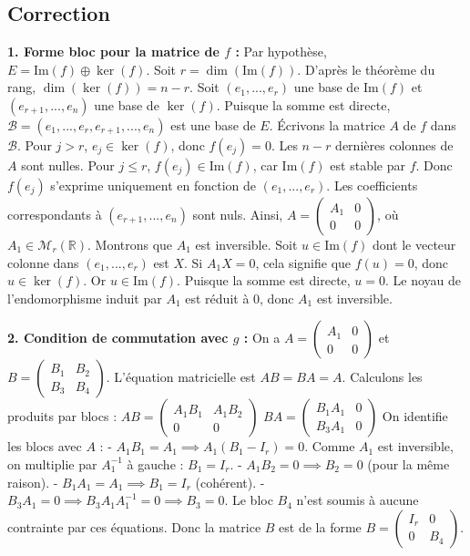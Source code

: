 \documentclass{report}
\begin{document}
\subsection*{Correction}
\textbf{1. Forme bloc pour la matrice de $f$ :}
Par hypothèse, $E = \text{Im}(f) \oplus \ker(f)$.
Soit $r = \dim(\text{Im}(f))$. D'après le théorème du rang, $\dim(\ker(f)) = n - r$.
Soit $(e_1, ..., e_r)$ une base de $\text{Im}(f)$ et $(e_{r+1}, ..., e_n)$ une base de $\ker(f)$.
Puisque la somme est directe, $\mathcal{B} = (e_1, ..., e_r, e_{r+1}, ..., e_n)$ est une base de $E$.
Écrivons la matrice $A$ de $f$ dans $\mathcal{B}$.
Pour $j > r$, $e_j \in \ker(f)$, donc $f(e_j) = 0$. Les $n-r$ dernières colonnes de $A$ sont nulles.
Pour $j \le r$, $f(e_j) \in \text{Im}(f)$, car $\text{Im}(f)$ est stable par $f$. Donc $f(e_j)$ s'exprime uniquement en fonction de $(e_1, ..., e_r)$. Les coefficients correspondants à $(e_{r+1}, ..., e_n)$ sont nuls.
Ainsi, $A = \begin{pmatrix} A_1 & 0 \\ 0 & 0 \end{pmatrix}$, où $A_1 \in \mathcal{M}_r(\mathbb{R})$.
Montrons que $A_1$ est inversible. Soit $u \in \text{Im}(f)$ dont le vecteur colonne dans $(e_1, ..., e_r)$ est $X$.
Si $A_1 X = 0$, cela signifie que $f(u) = 0$, donc $u \in \ker(f)$. Or $u \in \text{Im}(f)$. Puisque la somme est directe, $u = 0$.
Le noyau de l'endomorphisme induit par $A_1$ est réduit à $0$, donc $A_1$ est inversible.

\textbf{2. Condition de commutation avec $g$ :}
On a $A = \begin{pmatrix} A_1 & 0 \\ 0 & 0 \end{pmatrix}$ et $B = \begin{pmatrix} B_1 & B_2 \\ B_3 & B_4 \end{pmatrix}$.
L'équation matricielle est $AB = BA = A$.
Calculons les produits par blocs :
$AB = \begin{pmatrix} A_1 B_1 & A_1 B_2 \\ 0 & 0 \end{pmatrix}$
$BA = \begin{pmatrix} B_1 A_1 & 0 \\ B_3 A_1 & 0 \end{pmatrix}$
On identifie les blocs avec $A$ :
- $A_1 B_1 = A_1 \implies A_1(B_1 - I_r) = 0$. Comme $A_1$ est inversible, on multiplie par $A_1^{-1}$ à gauche : $B_1 = I_r$.
- $A_1 B_2 = 0 \implies B_2 = 0$ (pour la même raison).
- $B_1 A_1 = A_1 \implies B_1 = I_r$ (cohérent).
- $B_3 A_1 = 0 \implies B_3 A_1 A_1^{-1} = 0 \implies B_3 = 0$.
Le bloc $B_4$ n'est soumis à aucune contrainte par ces équations.
Donc la matrice $B$ est de la forme $B = \begin{pmatrix} I_r & 0 \\ 0 & B_4 \end{pmatrix}$.
\end{document}
